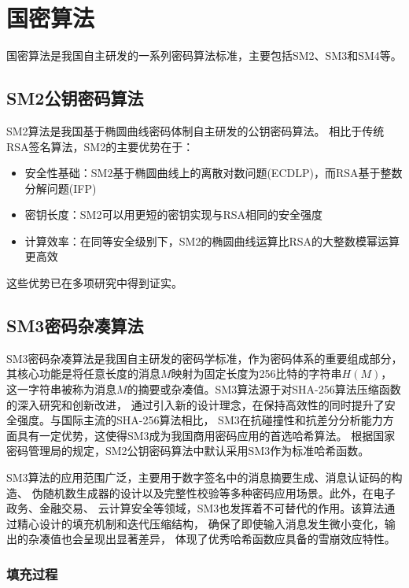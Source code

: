 \section{国密算法}

国密算法是我国自主研发的一系列密码算法标准，主要包括SM2、SM3和SM4等。

\subsection{SM2公钥密码算法}

SM2算法是我国基于椭圆曲线密码体制自主研发的公钥密码算法。
相比于传统RSA签名算法，SM2的主要优势在于：
\begin{itemize}
	\item 安全性基础：SM2基于椭圆曲线上的离散对数问题(ECDLP)，而RSA基于整数分解问题(IFP)
	\item 密钥长度：SM2可以用更短的密钥实现与RSA相同的安全强度
	\item 计算效率：在同等安全级别下，SM2的椭圆曲线运算比RSA的大整数模幂运算更高效
\end{itemize}

这些优势已在多项研究中得到证实。

\subsection{SM3密码杂凑算法}

SM3密码杂凑算法是我国自主研发的密码学标准，作为密码体系的重要组成部分，
其核心功能是将任意长度的消息$M$映射为固定长度为256比特的字符串$H(M)$，
这一字符串被称为消息$M$的摘要或杂凑值。SM3算法源于对SHA-256算法压缩函数的深入研究和创新改进，
通过引入新的设计理念，在保持高效性的同时提升了安全强度。与国际主流的SHA-256算法相比，
SM3在抗碰撞性和抗差分分析能力方面具有一定优势，这使得SM3成为我国商用密码应用的首选哈希算法。
根据国家密码管理局的规定，SM2公钥密码算法中默认采用SM3作为标准哈希函数。

SM3算法的应用范围广泛，主要用于数字签名中的消息摘要生成、消息认证码的构造、
伪随机数生成器的设计以及完整性校验等多种密码应用场景。此外，在电子政务、金融交易、
云计算安全等领域，SM3也发挥着不可替代的作用。该算法通过精心设计的填充机制和迭代压缩结构，
确保了即使输入消息发生微小变化，输出的杂凑值也会呈现出显著差异，
体现了优秀哈希函数应具备的雪崩效应特性。

\subsubsection{填充过程}

